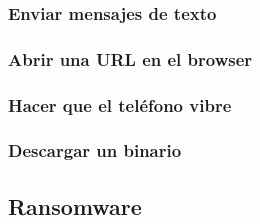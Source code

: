 \subsubsection{Enviar mensajes de texto}
\subsubsection{Abrir una URL en el browser}
\subsubsection{Hacer que el teléfono vibre}
\subsubsection{Descargar un binario}



\subsection{Ransomware}

%



